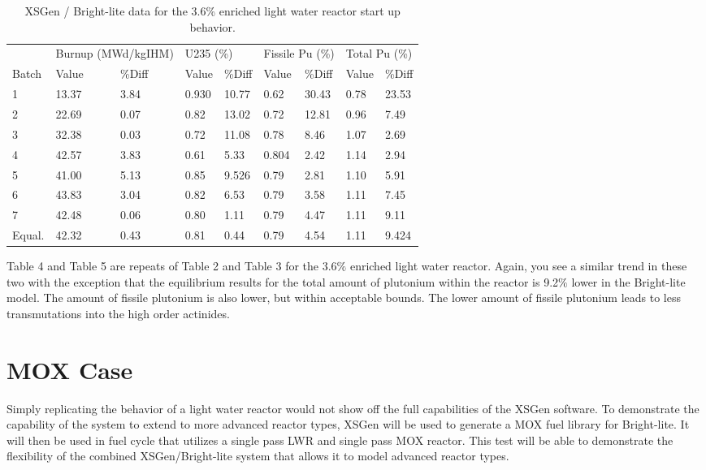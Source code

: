 \documentclass{article}
\begin{document}
\begin{table}[]
\centering
\caption{XSGen / Bright-lite data for the 3.6\% enriched light water reactor start up behavior.}
\label{Table 5}
\begin{tabular}{lllllllll}
 & \multicolumn{2}{l}{Burnup (MWd/kgIHM)} & \multicolumn{2}{l}{U235 (\%)} & \multicolumn{2}{l}{Fissile Pu (\%)} & \multicolumn{2}{l}{Total Pu (\%)} \\
Batch & Value & \%Diff & Value & \%Diff & Value & \%Diff & Value & \%Diff \\
1 & 13.37 & 3.84 & 0.930 & 10.77 & 0.62 & 30.43 & 0.78 & 23.53 \\
2 & 22.69 & 0.07 & 0.82 & 13.02 & 0.72 & 12.81 & 0.96 & 7.49 \\
3 & 32.38 & 0.03 & 0.72 & 11.08 & 0.78 & 8.46 & 1.07 & 2.69 \\
4 & 42.57 & 3.83 & 0.61 & 5.33 & 0.804 & 2.42 & 1.14 & 2.94 \\
5 & 41.00 & 5.13 & 0.85 & 9.526 & 0.79 & 2.81 & 1.10 & 5.91 \\
6 & 43.83 & 3.04 & 0.82 & 6.53 & 0.79 & 3.58 & 1.11 & 7.45 \\
7 & 42.48 & 0.06 & 0.80 & 1.11 & 0.79 & 4.47 & 1.11 & 9.11 \\
Equal. & 42.32 & 0.43 & 0.81 & 0.44 & 0.79 & 4.54 & 1.11 & 9.424
\end{tabular}
\end{table}

Table 4 and Table 5 are repeats of Table 2 and Table 3 for the 3.6$\%$ enriched light water reactor. Again, you see a similar trend in these two with the exception that the equilibrium results for the total amount of plutonium within the reactor is 9.2$\%$ lower in the Bright-lite model. The amount of fissile plutonium is also lower, but within acceptable bounds. The lower amount of fissile plutonium leads to less transmutations into the high order actinides. 

\section{MOX Case}
Simply replicating the behavior of a light water reactor would not show off the full capabilities of the XSGen software. To demonstrate the capability of the system to extend to more advanced reactor types, XSGen will be used to generate a MOX fuel library for Bright-lite. It will then be used in fuel cycle that utilizes a single pass LWR and single pass MOX reactor. This test will be able to demonstrate the flexibility of the combined XSGen/Bright-lite system that allows it to model advanced reactor types. 
\end{document}
